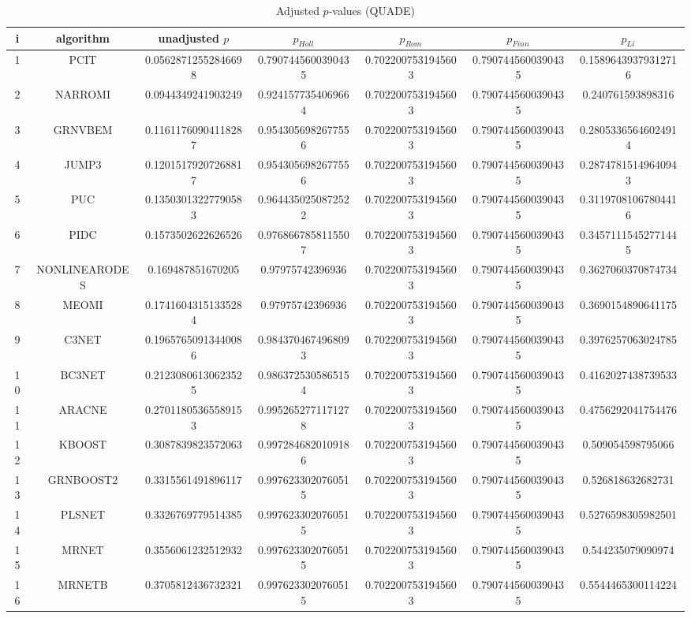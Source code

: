 \documentclass[a4paper,10pt]{article}
\begin{document}
\begin{landscape}
\begin{table}[!htp]
\centering\scriptsize
\caption{Adjusted $p$-values (QUADE)}
\begin{tabular}{ccccccc}
i&algorithm&unadjusted $p$&$p_{Holl}$&$p_{Rom}$&$p_{Finn}$&$p_{Li}$\\
\hline
1&PCIT&0.05628712552846698&0.7907445600390435&0.7022007531945603&0.7907445600390435&0.15896439379312716\\
2&NARROMI&0.0944349241903249&0.9241577354069664&0.7022007531945603&0.7907445600390435&0.240761593898316\\
3&GRNVBEM&0.11611760904118287&0.9543056982677556&0.7022007531945603&0.7907445600390435&0.28053365646024914\\
4&JUMP3&0.12015179207268817&0.9543056982677556&0.7022007531945603&0.7907445600390435&0.28747815149640943\\
5&PUC&0.13503013227790583&0.9644350250872522&0.7022007531945603&0.7907445600390435&0.31197081067804416\\
6&PIDC&0.1573502622626526&0.9768667858115507&0.7022007531945603&0.7907445600390435&0.34571115452771445\\
7&NONLINEARODES&0.169487851670205&0.97975742396936&0.7022007531945603&0.7907445600390435&0.3627060370874734\\
8&MEOMI&0.17416043151335284&0.97975742396936&0.7022007531945603&0.7907445600390435&0.3690154890641175\\
9&C3NET&0.19657650913440086&0.9843704674968093&0.7022007531945603&0.7907445600390435&0.3976257063024785\\
10&BC3NET&0.21230806130623525&0.9863725305865154&0.7022007531945603&0.7907445600390435&0.4162027438739533\\
11&ARACNE&0.27011805365589153&0.9952652771171278&0.7022007531945603&0.7907445600390435&0.4756292041754476\\
12&KBOOST&0.3087839823572063&0.9972846820109186&0.7022007531945603&0.7907445600390435&0.509054598795066\\
13&GRNBOOST2&0.3315561491896117&0.9976233020760515&0.7022007531945603&0.7907445600390435&0.526818632682731\\
14&PLSNET&0.3326769779514385&0.9976233020760515&0.7022007531945603&0.7907445600390435&0.5276598305982501\\
15&MRNET&0.3556061232512932&0.9976233020760515&0.7022007531945603&0.7907445600390435&0.544235079090974\\
16&MRNETB&0.3705812436732321&0.9976233020760515&0.7022007531945603&0.7907445600390435&0.5544465300114224\\

\end{tabular}
\end{table}
\end{landscape}
\end{document}
